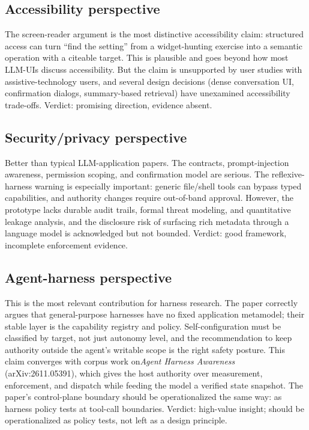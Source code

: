 \documentclass[11pt,a4paper]{article}
\begin{document}
\subsection{Accessibility perspective}
The screen-reader argument is the most distinctive accessibility claim: structured access can turn ``find the setting'' from a widget-hunting exercise into a semantic operation with a citeable target. This is plausible and goes beyond how most LLM-UIs discuss accessibility. But the claim is unsupported by user studies with assistive-technology users, and several design decisions (dense conversation UI, confirmation dialogs, summary-based retrieval) have unexamined accessibility trade-offs. Verdict: promising direction, evidence absent.

\subsection{Security/privacy perspective}
Better than typical LLM-application papers. The contracts, prompt-injection awareness, permission scoping, and confirmation model are serious. The reflexive-harness warning is especially important: generic file/shell tools can bypass typed capabilities, and authority changes require out-of-band approval. However, the prototype lacks durable audit trails, formal threat modeling, and quantitative leakage analysis, and the disclosure risk of surfacing rich metadata through a language model is acknowledged but not bounded. Verdict: good framework, incomplete enforcement evidence.

\subsection{Agent-harness perspective}
This is the most relevant contribution for harness research. The paper correctly argues that general-purpose harnesses have no fixed application metamodel; their stable layer is the capability registry and policy. Self-configuration must be classified by target, not just autonomy level, and the recommendation to keep authority outside the agent's writable scope is the right safety posture. This claim converges with corpus work on\emph{Agent Harness Awareness} (arXiv:2611.05391), which gives the host authority over measurement, enforcement, and dispatch while feeding the model a verified state snapshot. The paper's control-plane boundary should be operationalized the same way: as harness policy tests at tool-call boundaries. Verdict: high-value insight; should be operationalized as policy tests, not left as a design principle.
\end{document}
